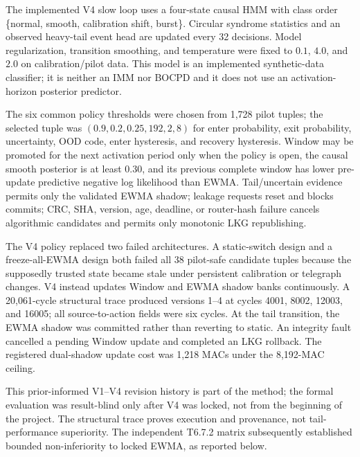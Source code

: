 \documentclass[11pt]{article}
\begin{document}
The implemented V4 slow loop uses a four-state causal HMM with class order
\{normal, smooth, calibration shift, burst\}.  Circular syndrome statistics and
an observed heavy-tail event head are updated every 32 decisions.  Model
regularization, transition smoothing, and temperature were fixed to
$0.1$, $4.0$, and $2.0$ on calibration/pilot data.  This model is an
implemented synthetic-data classifier; it is neither an IMM nor BOCPD and it
does not use an activation-horizon posterior predictor.

The six common policy thresholds were chosen from 1,728 pilot tuples; the
selected tuple was $(0.9,0.2,0.25,192,2,8)$ for enter probability, exit
probability, uncertainty, OOD code, enter hysteresis, and recovery hysteresis.
Window may be promoted for the next activation period only when the policy is
open, the causal smooth posterior is at least $0.30$, and its previous complete
window has lower pre-update predictive negative log likelihood than EWMA.
Tail/uncertain evidence permits only the validated EWMA shadow; leakage requests
reset and blocks commits; CRC, SHA, version, age, deadline, or router-hash
failure cancels algorithmic candidates and permits only monotonic LKG
republishing.

The V4 policy replaced two failed architectures.  A static-switch design and a
freeze-all-EWMA design both failed all 38 pilot-safe candidate tuples because
the supposedly trusted state became stale under persistent calibration or
telegraph changes.  V4 instead updates Window and EWMA shadow banks
continuously.  A 20,061-cycle structural trace produced versions 1--4 at cycles
4001, 8002, 12003, and 16005; all source-to-action fields were six cycles.  At
the tail transition, the EWMA shadow was committed rather than reverting to
static.  An integrity fault cancelled a pending Window update and completed an
LKG rollback.  The registered dual-shadow update cost was 1,218 MACs under the
8,192-MAC ceiling.

This prior-informed V1--V4 revision history is part of the method; the formal
evaluation was result-blind only after V4 was locked, not from the beginning of
the project.  The structural trace proves execution and provenance, not
tail-performance superiority.  The independent T6.7.2 matrix subsequently
established bounded non-inferiority to locked EWMA, as reported below.
\end{document}
